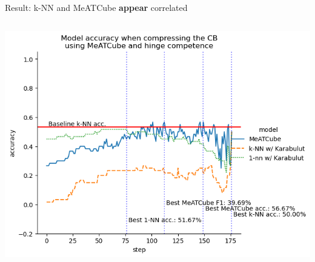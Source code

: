 \documentclass[]{beamer}
\begin{document}
\begin{frame}{Result: k-NN and MeATCube \textbf{appear} correlated}
\begin{columns}
\begin{column}{.65\textwidth}
            \includegraphics[width=.8\textwidth]{../results-weight-estim+/figs/heart+disease.png}
        \end{column}
    \end{columns}
\end{frame}
\end{document}
